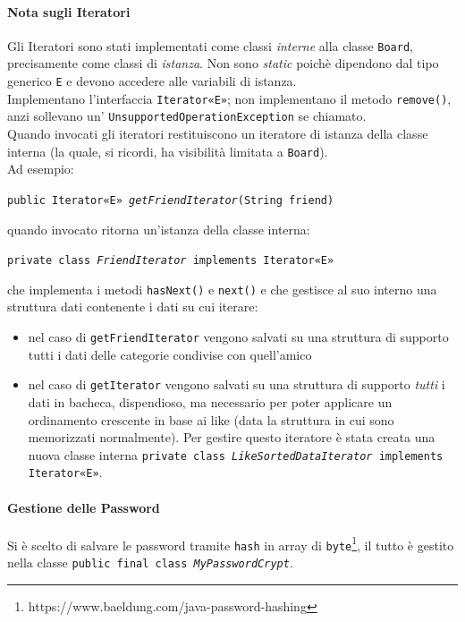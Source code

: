 \documentclass[10pt, a4paper]{article}
\begin{document}
\paragraph{Nota sugli Iteratori} Gli Iteratori sono stati implementati come classi \textit{interne} alla classe \texttt{Board}, precisamente come classi di \textit{istanza}. Non sono \textit{static} poichè dipendono dal tipo generico \texttt{E} e devono accedere alle variabili di istanza.\\ Implementano l'interfaccia \texttt{Iterator«E»}; non implementano il metodo \texttt{remove()}, anzi sollevano un' \texttt{UnsupportedOperationException} se chiamato.\\
Quando invocati gli iteratori restituiscono un iteratore di istanza della classe interna (la quale, si ricordi, ha visibilità limitata a \texttt{Board}). \\
Ad esempio: 
\begin{center}
	\texttt{public Iterator«E» \emph{getFriendIterator}(String friend)}
\end{center}
quando 	invocato ritorna un'istanza della classe interna:
\begin{center}
	\texttt{private class \emph{FriendIterator} implements Iterator«E» }
\end{center}
che implementa i metodi \texttt{hasNext()} e \texttt{next()} e che gestisce al suo interno una struttura dati contenente i dati su cui iterare:
\begin{itemize}
\item nel caso di \texttt{getFriendIterator} vengono salvati su una struttura di supporto tutti i dati delle categorie condivise con quell'amico
\item nel caso di \texttt{getIterator} vengono salvati su una struttura di supporto \textit{tutti} i dati in bacheca, dispendioso, ma necessario per poter applicare un ordinamento crescente in base ai like (data la struttura in cui sono memorizzati normalmente). Per gestire questo iteratore è stata creata una nuova classe interna \texttt{private class \emph{LikeSortedDataIterator} implements Iterator«E»}.
\end{itemize}
\paragraph{Gestione delle Password} Si è scelto di salvare le password tramite \texttt{hash} in array di \texttt{byte}\footnote{https://www.baeldung.com/java-password-hashing}, il tutto è gestito nella classe \texttt{public final class \emph{MyPasswordCrypt}}.
\end{document}

